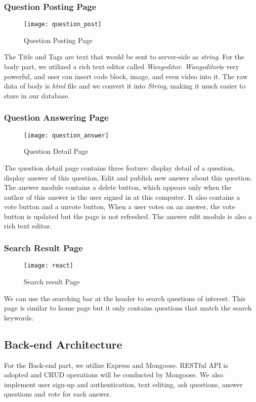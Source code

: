 \documentclass[11pt]{article}
\begin{document}
\subsubsection{Question Posting Page}
\begin{figure}[htp]
    \centering
    \texttt{[image: question\_post]}
    \caption{Question Posting Page}
    \label{fig:galaxy}
\end{figure}
The Title and Tags are text that would be sent to server-side as \textit{string}. For the body part, we utilized a rich text editor called \textit{Wangeditor}. \textit{Wangeditor}is very powerful, and user can insert code block, image, and even video into it. The raw data of body is \textit{html} file and we convert it into \textit{String}, making it much easier to store in our database.

\subsubsection{Question Answering Page}
\begin{figure}[htp]
    \centering
    \texttt{[image: question\_answer]}
    \caption{Question Detail Page}
    \label{fig:galaxy}
\end{figure}
The question detail page contains three feature: display detail of a question, display answer of this question, Edit and publish new answer about this question. The answer module contains a delete button, which appears only when the author of this answer is the user signed in at this computer. It also contains a vote button and a unvote button, When a user votes on an answer, the vote button is updated but the page is not refreshed. The answer edit module is also a rich text editor.

\subsubsection{Search Result Page}
\begin{figure}[htp]
    \centering
    \texttt{[image: react]}
    \caption{Search result Page}
    \label{fig:galaxy}
\end{figure}
We can use the searching bar at the header to search questions of interest. This page is similar to home page but it only contains questions that match the search keywords. 

\newpage

\subsection{Back-end Architecture}
For the Back-end part, we utilize Express and Mongoose. RESTful API is adopted and CRUD operations will be conducted by Mongoose. We also implement user sign-up and authentication, text editing, ask questions, answer questions and vote for each answer. 
\end{document}
